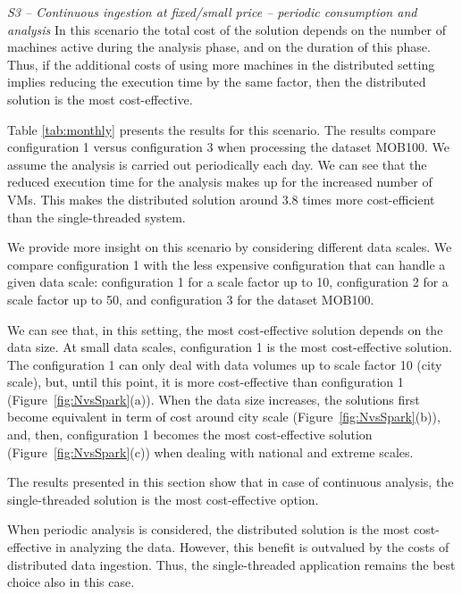 {\medskip

\textit{S3 -- Continuous ingestion at fixed/small price -- periodic consumption and analysis}
In this scenario the total cost of the solution depends on the number of machines active during the analysis phase, and on the duration of this phase. Thus, if the additional costs of using more machines in the distributed setting implies reducing the execution time by the same factor, then the distributed solution is the most cost-effective.

Table \ref{tab:monthly} presents the results for this scenario. The results  compare configuration \sparkdi{}1 versus configuration \sti{}3 when processing the dataset MOB100. We assume the analysis is carried out periodically each day. We can see that the reduced execution time for the analysis makes up for the increased number of VMs. This makes the distributed solution around 3.8 times more cost-efficient than the single-threaded system.

We provide more insight on this scenario by considering different data scales. We compare configuration \sparkdi{}1 with the less expensive \sti{} configuration that can handle a given data scale: configuration \sti{}1 for a scale factor up to 10, configuration \sti{}2 for a scale factor up to 50, and configuration \sti{}3 for the dataset MOB100.

We can see that, in this setting, the most cost-effective solution depends on the data size. At small data scales, configuration \sti{}1 is the most cost-effective solution. The configuration \sti{}1  can only deal with data volumes up to scale factor 10 (city scale), but, until this point, it is more cost-effective than configuration \sparkdi{}1 (Figure~\ref{fig:NvsSpark}(a)). When the data size increases, the solutions first become equivalent in term of cost around city scale (Figure~\ref{fig:NvsSpark}(b)), and, then, configuration \sparkdi{}1 becomes the most cost-effective solution (Figure~\ref{fig:NvsSpark}(c)) when dealing with national and extreme scales.

The results presented in this section show that in case of continuous analysis, the single-threaded solution is the most cost-effective option.

When periodic analysis is considered, the distributed solution is the most cost-effective in analyzing the data. However, this benefit is outvalued by the costs of distributed data ingestion. Thus, the single-threaded application remains the best choice also in this case.

}
